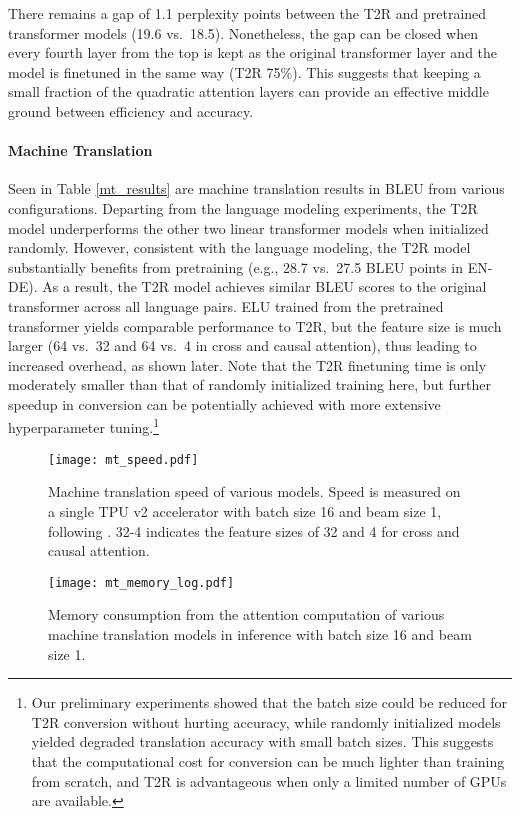 \documentclass[11pt,a4paper]{article}
\newcommand{\TRNN}{T2R\xspace}
\begin{document}
There remains a gap of 1.1 perplexity points between the \TRNN and pretrained transformer models (19.6 vs.\ 18.5).
Nonetheless, the gap can be closed when every fourth layer from the top is kept as the original transformer layer and the model is finetuned in the same way (\TRNN 75\%). 
This suggests that keeping a small fraction of the quadratic attention layers can provide an effective middle ground between efficiency and accuracy.



\paragraph{Machine Translation}
Seen in Table \ref{mt_results} are machine translation results in BLEU from various configurations.
Departing from the language modeling experiments, the \TRNN model underperforms the other two linear transformer models when initialized randomly.
However, consistent with the language modeling, the \TRNN model substantially benefits from pretraining (e.g., 28.7 vs.\ 27.5 BLEU points in EN-DE).
As a result, the \TRNN model achieves similar BLEU scores to the original transformer across all language pairs.
ELU trained from the pretrained transformer yields comparable performance to \TRNN, but the feature size is much larger (64 vs.\ 32 and 64 vs.\ 4 in cross and causal attention), thus leading to increased overhead, as shown later. Note that the \TRNN finetuning time is only moderately smaller than that of randomly initialized training here,
but further speedup in conversion can be potentially achieved with more extensive hyperparameter tuning.\footnote{Our preliminary experiments showed that the batch size could be reduced for \TRNN conversion without hurting accuracy, while randomly initialized models yielded degraded translation accuracy with small batch sizes. This suggests that the computational cost for conversion can be much lighter than training from scratch, and \TRNN is advantageous when only a limited number of GPUs are available.}

\begin{figure}[h]
\centering
    \texttt{[image: mt\_speed.pdf]}
\caption{Machine translation speed of various models. Speed is measured on a single TPU v2 accelerator with batch size 16 and beam size 1, following \citet{RFA}. 32-4 indicates the feature sizes of 32 and 4 for cross and causal attention. 
}
\label{fig:mt-speed}
\end{figure}
\begin{figure}[h]
\centering
    \texttt{[image: mt\_memory\_log.pdf]}
\caption{Memory consumption from the attention computation of various machine translation models in inference with batch size 16 and beam size 1. 
}
\label{fig:mt-memory}
\end{figure}
\end{document}
